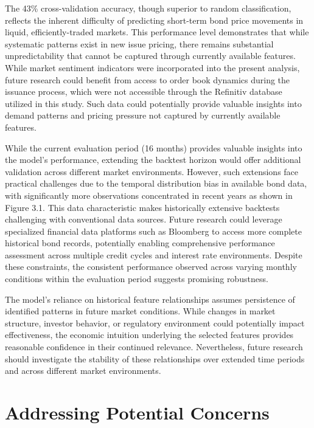 The 43\% cross-validation accuracy, though superior to random classification, reflects the inherent difficulty of predicting short-term bond price movements in liquid, efficiently-traded markets. This performance level demonstrates that while systematic patterns exist in new issue pricing, there remains substantial unpredictability that cannot be captured through currently available features. While market sentiment indicators were incorporated into the present analysis, future research could benefit from access to order book dynamics during the issuance process, which were not accessible through the Refinitiv database utilized in this study. Such data could potentially provide valuable insights into demand patterns and pricing pressure not captured by currently available features.

While the current evaluation period (16 months) provides valuable insights into the model's performance, extending the backtest horizon would offer additional validation across different market environments. However, such extensions face practical challenges due to the temporal distribution bias in available bond data, with significantly more observations concentrated in recent years as shown in Figure 3.1. This data characteristic makes historically extensive backtests challenging with conventional data sources. Future research could leverage specialized financial data platforms such as Bloomberg to access more complete historical bond records, potentially enabling comprehensive performance assessment across multiple credit cycles and interest rate environments. Despite these constraints, the consistent performance observed across varying monthly conditions within the evaluation period suggests promising robustness.

The model's reliance on historical feature relationships assumes persistence of identified patterns in future market conditions. While changes in market structure, investor behavior, or regulatory environment could potentially impact effectiveness, the economic intuition underlying the selected features provides reasonable confidence in their continued relevance. Nevertheless, future research should investigate the stability of these relationships over extended time periods and across different market environments.

\section{Addressing Potential Concerns}

